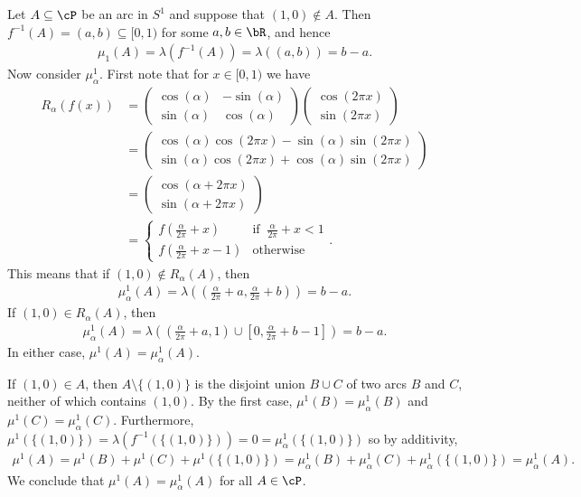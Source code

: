 \begin{homework}[e]
\begin{prf}
		Let $A \subseteq \cP$ be an arc in $S^1$ and suppose that $(1,0)\not\in A$. Then $f^{-1}(A) = (a,b) \subseteq [0,1)$ for some $a,b \in \bR$, and hence
		\begin{align*}
			\mu_1(A) = \lambda(f^{-1}(A)) = \lambda((a,b)) = b - a.
		\end{align*}
		Now consider $\mu^1_\alpha$. First note that for $x \in [0,1)$ we have
		\begin{align*}
			R_\alpha(f(x)) &= 
			\begin{pmatrix}	
				\cos(\alpha) & -\sin(\alpha) \\
				\sin(\alpha) & \cos(\alpha)
			\end{pmatrix} \begin{pmatrix}	\cos(2\pi x) \\ \sin(2\pi x)\end{pmatrix} \\
							 &= 
			\begin{pmatrix}	
				\cos(\alpha)\cos(2\pi x) -\sin(\alpha)\sin(2\pi x) \\
				\sin(\alpha)\cos(2\pi x) + \cos(\alpha)\sin(2\pi x)
			\end{pmatrix} \\
							 &= 
			\begin{pmatrix}	
				\cos(\alpha + 2\pi x) \\
				\sin(\alpha + 2\pi x)
			\end{pmatrix} \\
							 &= 
							 \begin{cases}
								 f\left(\frac{\alpha}{2\pi} + x\right) & \text{if }~ \frac{\alpha}{2\pi} + x < 1 \\
								 f\left(\frac{\alpha}{2\pi}+ x - 1\right) &\text{otherwise}
							 \end{cases}.
		\end{align*}
		This means that if $(1,0) \not\in R_\alpha(A)$, then
		\begin{align*}
			\mu^1_\alpha(A) = \lambda\left(\left(\frac{\alpha}{2\pi} + a, \frac{\alpha}{2\pi} + b\right)\right) = b - a.
		\end{align*}
		If $(1,0) \in R_\alpha(A)$, then
		\begin{align*}
			\mu^1_\alpha(A) = \lambda\left(\left(\frac{\alpha}{2\pi} + a, 1\right)\cup [0,\frac{\alpha}{2\pi} + b - 1]\right) = b - a.
		\end{align*}
		In either case, $\mu^1(A) = \mu^1_\alpha(A)$.

		If $(1,0) \in A$, then $A \setminus \{(1,0)\}$ is the disjoint union $B \cup C$ of two arcs $B$ and $C$, neither of which contains $(1,0)$. By the first case, $\mu^1(B) = \mu^1_\alpha(B)$ and $\mu^1(C) = \mu^1_\alpha(C)$. Furthermore, $\mu^1(\{(1,0)\}) = \lambda(f^{-1}(\{(1,0)\})) = 0 = \mu^1_\alpha(\{(1,0)\})$ so by additivity,
		\begin{align*}
			\mu^1(A) = \mu^1(B) + \mu^1(C) + \mu^1(\{(1,0)\}) = \mu^1_\alpha(B) + \mu^1_\alpha(C) + \mu^1_\alpha(\{(1,0)\}) = \mu^1_\alpha(A).
		\end{align*}
		We conclude that $\mu^1(A) = \mu^1_\alpha(A)$ for all $A\in \cP$.


\end{prf}
\end{homework}
